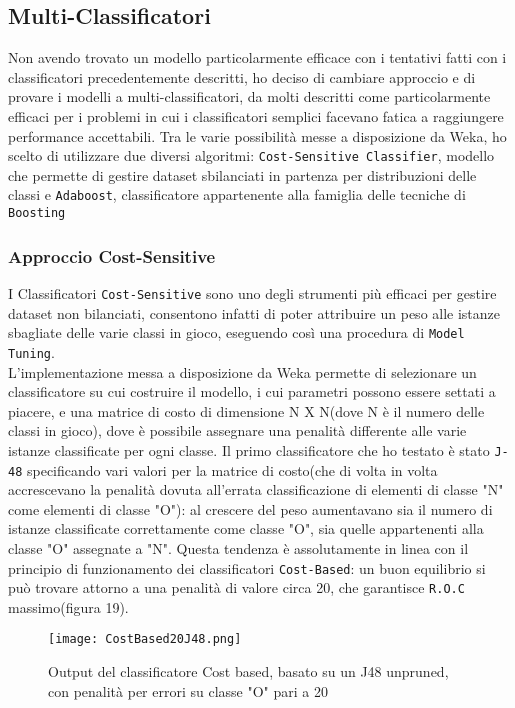   \subsection{Multi-Classificatori}
Non avendo trovato un modello particolarmente efficace con i tentativi fatti con i classificatori precedentemente descritti, ho deciso di cambiare approccio e di provare i modelli a multi-classificatori, da molti descritti come particolarmente efficaci per i problemi in cui i classificatori semplici  facevano fatica a raggiungere performance accettabili.
Tra le varie possibilità messe a disposizione da Weka, ho scelto di utilizzare due diversi algoritmi: \texttt{Cost-Sensitive Classifier}, modello che permette di gestire dataset sbilanciati in partenza per distribuzioni delle classi e \texttt{Adaboost}, classificatore appartenente alla famiglia delle tecniche di \texttt{Boosting}
  \subsubsection{Approccio Cost-Sensitive}
  I Classificatori \texttt{Cost-Sensitive} sono uno degli strumenti più efficaci per gestire dataset non bilanciati, consentono infatti di poter attribuire un peso alle istanze sbagliate delle varie classi in gioco, eseguendo così una procedura di \texttt{Model Tuning}.\\
  L'implementazione messa a disposizione da Weka permette di selezionare un classificatore su cui costruire il modello, i cui parametri possono essere settati a piacere, e una matrice di costo di dimensione N X N(dove N è il numero delle classi in gioco), dove è possibile assegnare una penalità differente alle varie istanze classificate per ogni classe.
  Il primo classificatore che ho testato è stato \texttt{J-48} specificando vari valori per la matrice di costo(che di volta in volta accrescevano la penalità dovuta all'errata classificazione di elementi di classe "N" come elementi di classe "O"): al crescere del peso aumentavano sia il numero di istanze classificate correttamente come classe "O", sia quelle appartenenti alla classe "O" assegnate a "N".
  Questa tendenza è assolutamente in linea con il principio di funzionamento dei classificatori \texttt{Cost-Based}: un buon equilibrio si può trovare attorno a una penalità di valore circa 20, che garantisce \texttt{R.O.C} massimo(figura 19).
  
  \begin{figure}[H]
  	\texttt{[image: CostBased20J48.png]}
  	\caption{Output del classificatore Cost based, basato su un J48 unpruned, con penalità per errori su classe "O" pari a 20 }
  \end{figure} 

